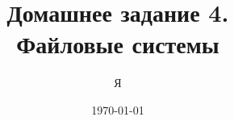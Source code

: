 \documentclass[12pt,a4paper,oneside]{article}
\title{Домашнее задание 4. \\ Файловые системы}
\author{Я}
\date{\today}
\begin{document}
  \sloppy
  \maketitle
  \tableofcontents
  \clearpage

  
  
  

\end{document}
